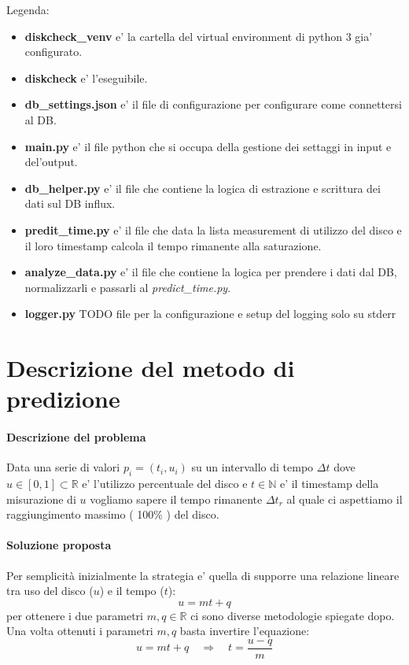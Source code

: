\documentclass{article}
\begin{document}
Legenda:
\begin{itemize}
    \item \textbf{diskcheck\_venv} e' la cartella del virtual environment di python 3 gia' configurato.
    \item \textbf{diskcheck} e' l'eseguibile.
    \item \textbf{db\_settings.json} e' il file di configurazione per configurare come connettersi al DB.
    \item \textbf{main.py} e' il file python che si occupa della gestione dei settaggi in input e del'output.
    \item \textbf{db\_helper.py} e' il file che contiene la logica di estrazione e scrittura dei dati sul DB influx.
    \item \textbf{predit\_time.py} e' il file che data la lista measurement di utilizzo del disco e il loro timestamp calcola il tempo rimanente alla saturazione.
    \item \textbf{analyze\_data.py} e' il file che contiene la logica per prendere i dati dal DB, normalizzarli e passarli al \textit{predict\_time.py}.
    \item \textbf{logger.py} TODO file per la configurazione e setup del logging solo su stderr
\end{itemize}

\clearpage
\part*{Descrizione del metodo di predizione}

\subsection{Descrizione del problema}
Data una serie di valori \(p_i = (t_i, u_i)\) su un intervallo di tempo \(\Delta t\) dove \(u \in [0, 1] \subset \mathbb{R}\) e' l'utilizzo percentuale del  disco e \(t \in \mathbb{N}\) e' il timestamp  della misurazione di \(u\) vogliamo sapere il tempo rimanente \(\Delta t_r\) al quale ci aspettiamo il raggiungimento massimo ( 100\% ) del disco. 

\subsection{Soluzione proposta}
Per semplicità inizialmente la strategia e' quella di supporre una relazione lineare tra uso del disco (\(u\)) e il tempo (\(t\)):
\[u = m t + q\]
per ottenere i due parametri \(m, q \in \mathbb{R}\) ci sono diverse metodologie spiegate dopo.
\\
Una volta ottenuti i parametri \(m, q\) basta invertire l'equazione:
\[u = m t + q \quad \Rightarrow \quad t = \frac{u - q}{m}\]
\end{document}
